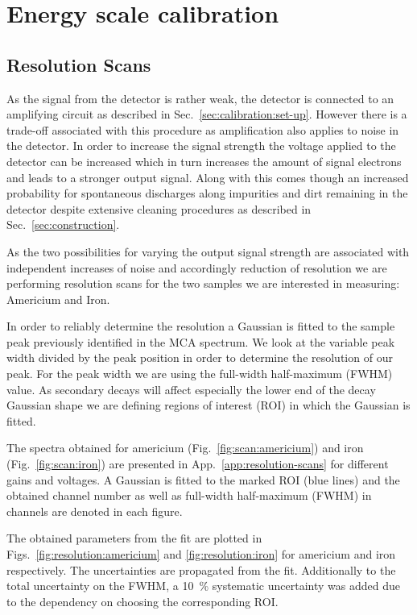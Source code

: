 \section{Energy scale calibration}
\label{sec:energy_scan}

\subsection{Resolution Scans}
\label{sec:resolution_scans}
As the signal from the detector is rather weak, the detector is connected to an
amplifying circuit as described in Sec.~\ref{sec:calibration:set-up}. However
there is a trade-off associated with this procedure as amplification also
applies to noise in the detector. In order to increase the signal strength the
voltage applied to the detector can be increased which in turn increases the
amount of signal electrons and leads to a stronger output signal. Along with
this comes though an increased probability for spontaneous discharges along
impurities and dirt remaining in the detector despite extensive cleaning
procedures as described in Sec.~\ref{sec:construction}.

As the two possibilities for varying the output signal strength are associated
with independent increases of noise and accordingly reduction of resolution we
are performing resolution scans for the two samples we are interested in
measuring: Americium and Iron.

In order to reliably determine the resolution a Gaussian is fitted to the sample
peak previously identified in the MCA spectrum. We look
at the variable peak width divided by the peak position in order to determine
the resolution of our peak. For the peak width we are using the full-width
half-maximum (FWHM) value. As secondary decays will affect especially the lower
end of the decay Gaussian shape we are defining regions of interest (ROI) in which the Gaussian
is fitted.

The spectra obtained for americium (Fig.~\ref{fig:scan:americium}) and iron
(Fig.~\ref{fig:scan:iron}) are presented in App.~\ref{app:resolution-scans} for different gains and voltages.
A Gaussian is fitted to the marked ROI (blue lines) and the obtained channel number as well as
full-width half-maximum (FWHM) in channels are denoted in each figure.

The obtained parameters from the fit are plotted in Figs.~\ref{fig:resolution:americium} and \ref{fig:resolution:iron} for americium and
iron respectively. The uncertainties are propagated from the fit. Additionally to the
total uncertainty on the FWHM, a \SI{10}{\percent} systematic
uncertainty was added due to the dependency on choosing the corresponding ROI.

